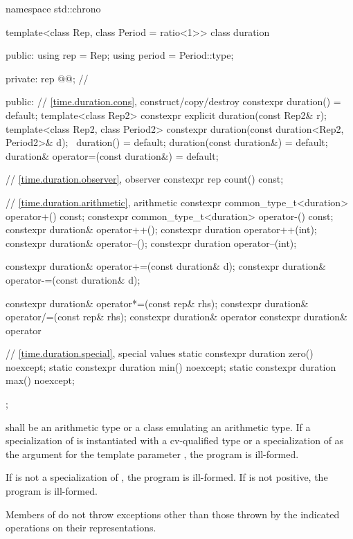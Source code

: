 %
\begin{codeblock}
namespace std::chrono {
  template<class Rep, class Period = ratio<1>>
  class duration {
  public:
    using rep    = Rep;
    using period = Period::type;

  private:
    rep @@;       // \expos

  public:
    // \ref{time.duration.cons}, construct/copy/destroy
    constexpr duration() = default;
    template<class Rep2>
      constexpr explicit duration(const Rep2& r);
    template<class Rep2, class Period2>
      constexpr duration(const duration<Rep2, Period2>& d);
    ~duration() = default;
    duration(const duration&) = default;
    duration& operator=(const duration&) = default;

    // \ref{time.duration.observer}, observer
    constexpr rep count() const;

    // \ref{time.duration.arithmetic}, arithmetic
    constexpr common_type_t<duration> operator+() const;
    constexpr common_type_t<duration> operator-() const;
    constexpr duration& operator++();
    constexpr duration  operator++(int);
    constexpr duration& operator--();
    constexpr duration  operator--(int);

    constexpr duration& operator+=(const duration& d);
    constexpr duration& operator-=(const duration& d);

    constexpr duration& operator*=(const rep& rhs);
    constexpr duration& operator/=(const rep& rhs);
    constexpr duration& operator%
    constexpr duration& operator%

    // \ref{time.duration.special}, special values
    static constexpr duration zero() noexcept;
    static constexpr duration min() noexcept;
    static constexpr duration max() noexcept;
  };
}
\end{codeblock}

\pnum
{} shall be an arithmetic type or a class emulating an arithmetic type.
If a specialization of 
is instantiated with
a cv-qualified type or a specialization of 
as the argument for the template
parameter , the program is ill-formed.

\pnum
If  is not a specialization of , the program is ill-formed.
If  is not positive, the program is ill-formed.

\pnum
Members of  do not throw exceptions other than
those thrown by the indicated operations on their representations.

